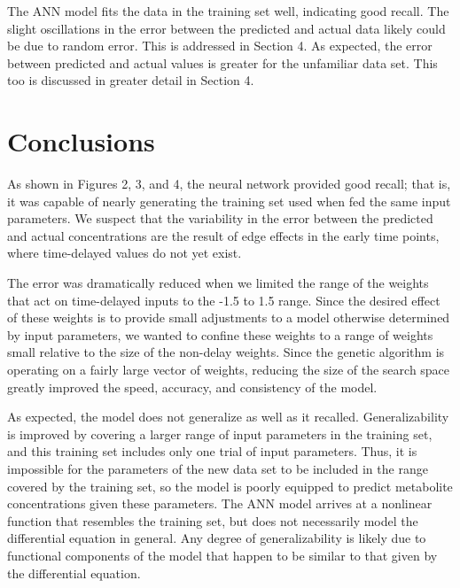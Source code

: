 \documentclass[10pt]{article}
\begin{document}
The ANN model fits the data in the training set well, indicating good recall. The slight oscillations in the error between the predicted and actual data likely could be due to random error. This is addressed in Section 4. As expected, the error between predicted and actual values is greater for the unfamiliar data set. This too is discussed in greater detail in Section 4. 

\section{Conclusions}
As shown in Figures 2, 3, and 4, the neural network provided good recall; that is, it was capable of nearly generating the training set used when fed the same input parameters. We suspect that the variability in the error between the predicted and actual concentrations are the result of edge effects in the early time points, where time-delayed values do not yet exist. 

The error was dramatically reduced when we limited the range of the weights that act on time-delayed inputs to the -1.5 to 1.5 range. Since the desired effect of these weights is to provide small adjustments to a model otherwise determined by input parameters, we wanted to confine these weights to a range of weights small relative to the size of the non-delay weights. Since the genetic algorithm is operating on a fairly large vector of weights, reducing the size of the search space greatly improved the speed, accuracy, and consistency of the model.

As expected, the model does not generalize as well as it recalled. Generalizability is improved by covering a larger range of input parameters in the training set, and this training set includes only one trial of input parameters. Thus, it is impossible for the parameters of the new data set to be included in the range covered by the training set, so the model is poorly equipped to predict metabolite concentrations given these parameters. The ANN model arrives at a nonlinear function that resembles the training set, but does not necessarily model the differential equation in general. Any degree of generalizability is likely due to functional components of the model that happen to be similar to that given by the differential equation.

\end{document}
